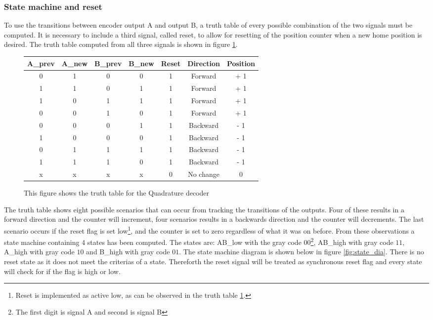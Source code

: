 \documentclass[../../../main]{subfiles}
\begin{document}
\subsubsection{State machine and reset}
\label{subsubsec:reset_state}
To use the transitions between encoder output A and output B, a truth table of every possible combination of the two signals must be computed. It is necessary to include a third signal, called reset, to allow for resetting of the position counter when a new home position is desired. The truth table computed from all three signals is shown in figure \ref{fig:truth_table}.
\begin{figure}[H]
  \begin{tabular}{|c | c | c | c | c | c |c|}
  \hline
   A\_prev & A\_new & B\_prev & B\_new & Reset & Direction & Position \\
   \hline
   0 & 1 & 0 & 0 & 1 & Forward & + 1 \\
   1 & 1 & 0 & 1 & 1 & Forward & + 1 \\
   1 & 0 & 1 & 1 & 1 & Forward & + 1 \\
   0 & 0 & 1 & 0 & 1 & Forward & + 1 \\
   0 & 0 & 0 & 1 & 1 & Backward & - 1 \\
   1 & 0 & 0 & 0 & 1 & Backward & - 1 \\
   0 & 1 & 1 & 1 & 1 & Backward & - 1 \\
   1 & 1 & 1 & 0 & 1 & Backward & - 1 \\
   x & x & x & x & 0 & No change &  0 \\
   \hline
  \end{tabular}
  \caption{This figure shows the truth table for the Quadrature decoder}
  \label{fig:truth_table}
\end{figure}
The truth table shows eight possible scenarios that can occur from tracking the transitions of the outputs. Four of these results in a forward direction and the counter will increment, four scenarios results in a backwards direction and the counter will decrements. The last scenario occurs if the reset flag is set low\footnote{Reset is implemented as active low, as can be observed in the truth table \ref{fig:truth_table}.}, and the counter is set to zero regardless of what it was on before. From these observations a state machine containing 4 states has been computed. The states are: AB\_low with the gray code $00$\footnote{The first digit is signal A and second is signal B}, AB\_high with gray code $11$, A\_high with gray code $10$ and B\_high with gray code $01$. The state machine diagram is shown below in figure \ref{fig:state_dia}.  There is no reset state as it does not meet the criterias of a state. Thereforth the reset signal will be treated as synchronous reset flag and every state will check for if the flag is high or low. \\
\end{document}
